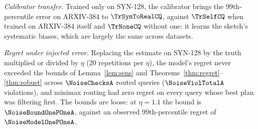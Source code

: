 
\emph{Calibrator transfer.} Trained only on SYN-128, the calibrator brings the 99th-percentile error on ARXIV-384 to $\TrSynToRealCQ$, against $\TrSelfCQ$ when trained on ARXIV-384 itself and $\TrNoneCQ$ without one: it learns the sketch's systematic biases, which are largely the same across datasets.

\emph{Regret under injected error.} Replacing the estimate on SYN-128 by the truth multiplied or divided by $\eta$ (20 repetitions per $\eta$), the model's regret never exceeded the bounds of Lemma~\ref{lem:sens} and Theorems~\ref{thm:regret}--\ref{thm:robust} across $\NoiseChecksA$ routed queries ($\NoiseViolTotalA$ violations), and minimax routing had zero regret on every query whose best plan was filtering first. The bounds are loose: at $\eta=1.1$ the bound is $\NoiseBoundOnePOneA$, against an observed 99th-percentile regret of $\NoiseModelOnePOneA$.


